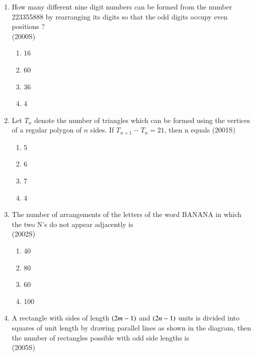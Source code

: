 \documentclass[journal,12pt,twocolumn]{IEEEtran}
\theoremstyle{remark}
\begin{document}
\begin{enumerate}[start=3]
\begin{multicols}{2}
\begin{enumerate}
\end{enumerate}
\end{multicols}
\item How many different nine digit numbers can be formed from the number 223355888 by rearranging its digits so that the odd digits occupy even positions ?\\
\hspace*{\fill}(2000S)\\
\begin{multicols}{2} 
\begin{enumerate}
\item16 \item 60\columnbreak\item 36\item 4
\end{enumerate}
\end{multicols}
\item Let $T_n$ denote the number of triangles which can be formed using the vertices of a regular polygon of $n$ sides. If $T_{n+1}-T_n=21$, then n equals
\hfill{(2001S)}\\
\begin{multicols}{2} 
\begin{enumerate}
\item 5\item 6\columnbreak\item  7\item  4
\end{enumerate}
\end{multicols}
\item The number of arrangements of the letters of the word BANANA in which the two N's do not appear adjacently is\\
\hspace*{\fill}(2002S)
\begin{multicols}{2} 
\begin{enumerate}
\item  40\item 80\columnbreak\item  60\item  100
\end{enumerate}
\end{multicols}
\item A rectangle with sides of length $\left(2m-1\right)$ and $\left(2n-1\right)$ units is divided into squares of unit length by drawing parallel lines as shown in the diagram, then the number of rectangles possible with odd side lengths is\\
\hspace*{\fill}(2005S)

\end{enumerate}
\end{document}
